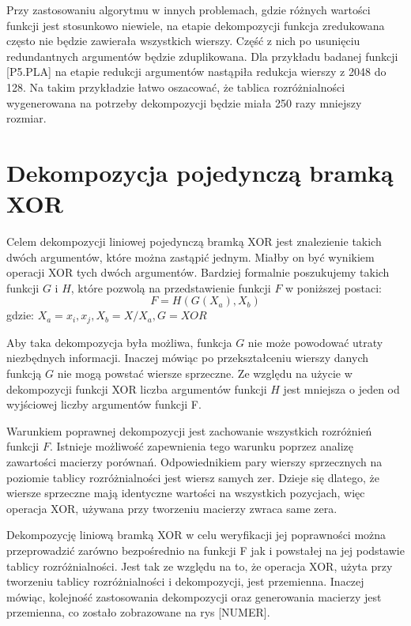 Przy zastosowaniu algorytmu w innych problemach,
gdzie różnych wartości funkcji jest stosunkowo niewiele,
na etapie dekompozycji funkcja zredukowana często nie będzie zawierała wszystkich wierszy.
Część z nich po usunięciu redundantnych argumentów będzie zduplikowana.
Dla przykładu badanej funkcji [P5.PLA] na etapie redukcji argumentów nastąpiła redukcja wierszy z 2048 do 128.
Na takim przykładzie łatwo oszacować,
że tablica rozróżnialności wygenerowana na potrzeby dekompozycji będzie miała 250 razy mniejszy rozmiar.

\section{Dekompozycja pojedynczą bramką XOR}

Celem dekompozycji liniowej pojedynczą bramką XOR jest znalezienie takich dwóch argumentów,
które można zastąpić jednym.
Miałby on być wynikiem operacji XOR tych dwóch argumentów.
Bardziej formalnie poszukujemy takich funkcji $G$ i $H$,
które pozwolą na przedstawienie funkcji $F$ w poniższej postaci:
\begin{equation}
F = H( G ( X_a ), X_b)
\end{equation}
gdzie: $X_a = {x_i, x_j}, X_b = X / X_a, G = XOR$

Aby taka dekompozycja była możliwa,
funkcja $G$ nie może powodować utraty niezbędnych informacji.
Inaczej mówiąc po przekształceniu wierszy danych funkcją $G$ nie mogą powstać wiersze sprzeczne.
Ze względu na użycie w dekompozycji funkcji XOR liczba argumentów funkcji $H$ jest mniejsza o jeden od wyjściowej liczby argumentów funkcji F.

Warunkiem poprawnej dekompozycji jest zachowanie wszystkich rozróżnień funkcji $F$.
Istnieje możliwość zapewnienia tego warunku poprzez analizę zawartości macierzy porównań.
Odpowiednikiem pary wierszy sprzecznych na poziomie tablicy rozróżnialności jest wiersz samych zer.
Dzieje się dlatego,
że wiersze sprzeczne mają identyczne wartości na wszystkich pozycjach,
więc operacja XOR,
używana przy tworzeniu macierzy zwraca same zera.

Dekompozycję liniową bramką XOR w celu weryfikacji jej poprawności można przeprowadzić zarówno bezpośrednio na funkcji F jak i powstałej na jej podstawie tablicy rozróżnialności.
Jest tak ze względu na to,
że operacja XOR,
użyta przy tworzeniu tablicy rozróżnialności i dekompozycji,
jest przemienna.
Inaczej mówiąc,
kolejność zastosowania dekompozycji oraz generowania macierzy jest przemienna,
co zostało zobrazowane na rys [NUMER].

